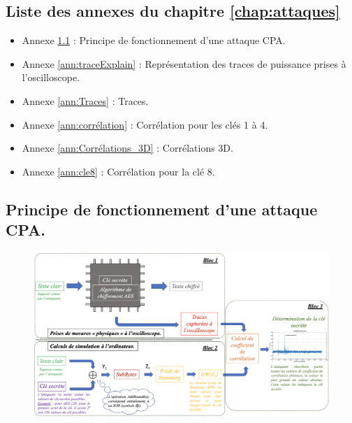 \documentclass[oneside]{book}
\begin{document}
\begin{appendices}
\chapter{Liste des annexes du chapitre \ref{chap:attaques}}
\begin{itemize}
\item Annexe \ref{ann:CPAconcrete} : Principe de fonctionnement d'une attaque CPA.
\item Annexe \ref{ann:traceExplain} : Représentation des traces de puissance prises à l'oscilloscope.
\item Annexe \ref{ann:Traces} : Traces.
\item Annexe \ref{ann:corrélation} : Corrélation pour les clés 1 à 4.
\item Annexe \ref{ann:Corrélations_3D} : Corrélations 3D.
\item Annexe \ref{ann:cle8} : Corrélation pour la clé 8.
\end{itemize}

\newpage

\section{Principe de fonctionnement d'une attaque CPA.}
\label{ann:CPAconcrete}
\begin{figure}[htbp]
    \centering
    \includegraphics[scale=0.52, angle=90]{image/CPAconcrete}
    \label{fig:CPAconcrete}
\end{figure}

\newpage


\end{appendices}
\end{document}
